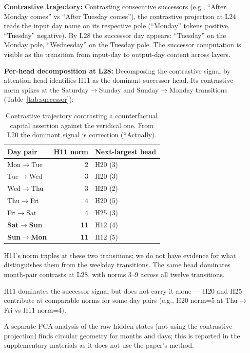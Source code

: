 \documentclass[11pt]{article}
\begin{document}
\textbf{Contrastive trajectory:} Contrasting consecutive successors (e.g., ``After
Monday comes'' vs ``After Tuesday comes''), the contrastive projection at L24
reads the input day name on its respective pole (``Monday'' tokens positive,
``Tuesday'' negative). By L28 the successor day appears: ``Tuesday'' on the
Monday pole, ``Wednesday'' on the Tuesday pole. The successor computation is
visible as the transition from input-day to output-day content across layers.

\textbf{Per-head decomposition at L28:} Decomposing the contrastive signal by
attention head identifies H11 as the dominant successor head. Its contrastive
norm spikes at the Saturday$\rightarrow$Sunday and Sunday$\rightarrow$Monday transitions (Table~\ref{tab:successor}):

\begin{table}[htbp]
\centering
\small
\begin{tabular}{lrl}
\toprule
Day pair & H11 norm & Next-largest head \\
\midrule
Mon$\rightarrow$Tue & 2 & H20 (3) \\
Tue$\rightarrow$Wed & 3 & H20 (3) \\
Wed$\rightarrow$Thu & 3 & H20 (2) \\
Thu$\rightarrow$Fri & 4 & H20 (5) \\
Fri$\rightarrow$Sat & 4 & H25 (3) \\
\textbf{Sat$\rightarrow$Sun} & \textbf{11} & H12 (4) \\
\textbf{Sun$\rightarrow$Mon} & \textbf{11} & H12 (5) \\
\bottomrule
\end{tabular}
\caption{Contrastive trajectory contrasting a counterfactual capital assertion against the veridical one. From L20 the dominant signal is correction (``Actually).}
\label{tab:counterfactual}
\end{table}

H11's norm triples at these two transitions; we do not have evidence for what
distinguishes them from the weekday transitions. The same head dominates
month-pair contrasts at L28, with norms 3--9 across all twelve transitions.

H11 dominates the successor signal but does not carry it alone --- H20 and H25
contribute at comparable norms for some day pairs (e.g., H20 norm=5 at
Thu$\rightarrow$Fri vs H11 norm=4).

A separate PCA analysis of the raw hidden states (not using the contrastive
projection) finds circular geometry for months and days; this is reported in
the supplementary materials as it does not use the paper's method.
\end{document}
